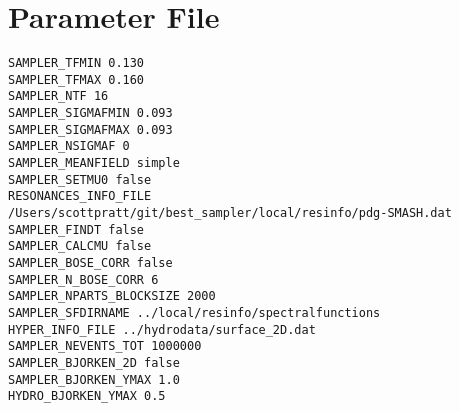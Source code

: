 \section{Parameter File}
{\tt\begin{verbatim}
SAMPLER_TFMIN 0.130
SAMPLER_TFMAX 0.160
SAMPLER_NTF 16
SAMPLER_SIGMAFMIN 0.093
SAMPLER_SIGMAFMAX 0.093
SAMPLER_NSIGMAF 0
SAMPLER_MEANFIELD simple
SAMPLER_SETMU0 false
RESONANCES_INFO_FILE /Users/scottpratt/git/best_sampler/local/resinfo/pdg-SMASH.dat
SAMPLER_FINDT false
SAMPLER_CALCMU false
SAMPLER_BOSE_CORR false
SAMPLER_N_BOSE_CORR 6
SAMPLER_NPARTS_BLOCKSIZE 2000
SAMPLER_SFDIRNAME ../local/resinfo/spectralfunctions
HYPER_INFO_FILE ../hydrodata/surface_2D.dat
SAMPLER_NEVENTS_TOT 1000000
SAMPLER_BJORKEN_2D false
SAMPLER_BJORKEN_YMAX 1.0
HYDRO_BJORKEN_YMAX 0.5

\end{verbatim}}
